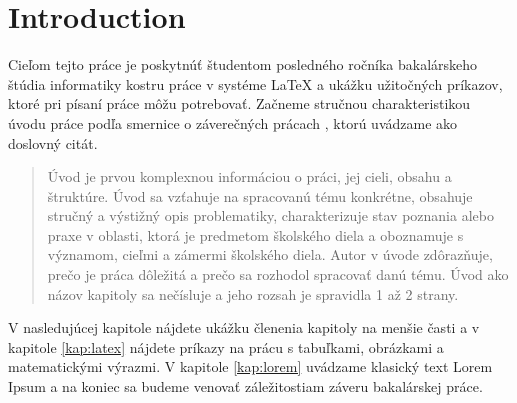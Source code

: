 \chapter*{Introduction} %

Cieľom tejto práce je poskytnúť študentom posledného ročníka
bakalárskeho štúdia informatiky kostru práce v systéme LaTeX a ukážku
užitočných príkazov, ktoré pri písaní práce môžu potrebovať. Začneme
stručnou charakteristikou úvodu práce podľa smernice o záverečných
prácach \cite{smernica}, ktorú uvádzame ako doslovný citát.

\begin{quote}
Úvod je prvou komplexnou informáciou o práci, jej cieli, obsahu a štruktúre. Úvod sa 
vzťahuje na spracovanú tému konkrétne, obsahuje stručný a výstižný opis 
problematiky, charakterizuje stav poznania alebo praxe v oblasti, ktorá je predmetom 
školského diela a oboznamuje s významom, cieľmi a zámermi školského diela. Autor 
v úvode zdôrazňuje, prečo je práca dôležitá a prečo sa rozhodol spracovať danú tému. 
Úvod ako názov kapitoly sa nečísluje a jeho rozsah je spravidla 1 až 2 strany.
\end{quote}

V nasledujúcej kapitole nájdete ukážku členenia kapitoly na menšie
časti a v kapitole \ref{kap:latex} nájdete príkazy na prácu s
tabuľkami, obrázkami a matematickými výrazmi. V kapitole
\ref{kap:lorem} uvádzame klasický text Lorem Ipsum a na koniec sa
budeme venovať záležitostiam záveru bakalárskej práce. 

